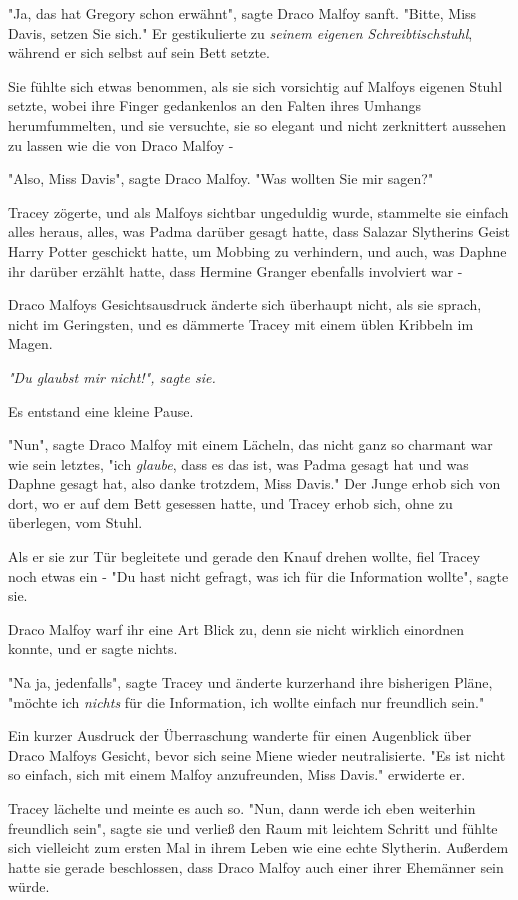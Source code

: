 {"Ja, das hat Gregory schon erwähnt", sagte Draco Malfoy sanft. "Bitte, Miss Davis, setzen Sie sich." Er gestikulierte zu \emph{seinem eigenen Schreibtischstuhl}, während er sich selbst auf sein Bett setzte.

Sie fühlte sich etwas benommen, als sie sich vorsichtig auf Malfoys eigenen Stuhl setzte, wobei ihre Finger gedankenlos an den Falten ihres Umhangs herumfummelten, und sie versuchte, sie so elegant und nicht zerknittert aussehen zu lassen wie die von Draco Malfoy -

"Also, Miss Davis", sagte Draco Malfoy. "Was wollten Sie mir sagen?"

Tracey zögerte, und als Malfoys sichtbar ungeduldig wurde, stammelte sie einfach alles heraus, alles, was Padma darüber gesagt hatte, dass Salazar Slytherins Geist Harry Potter geschickt hatte, um Mobbing zu verhindern, und auch, was Daphne ihr darüber erzählt hatte, dass Hermine Granger ebenfalls involviert war -

Draco Malfoys Gesichtsausdruck änderte sich überhaupt nicht, als sie sprach, nicht im Geringsten, und es dämmerte Tracey mit einem üblen Kribbeln im Magen.

\emph{\emph{"Du glaubst mir nicht!", sagte sie.}}

Es entstand eine kleine Pause.

"Nun", sagte Draco Malfoy mit einem Lächeln, das nicht ganz so charmant war wie sein letztes, "ich \emph{glaube}, dass es das ist, was Padma gesagt hat und was Daphne gesagt hat, also danke trotzdem, Miss Davis." Der Junge erhob sich von dort, wo er auf dem Bett gesessen hatte, und Tracey erhob sich, ohne zu überlegen, vom Stuhl.

Als er sie zur Tür begleitete und gerade den Knauf drehen wollte, fiel Tracey noch etwas ein - "Du hast nicht gefragt, was ich für die Information wollte", sagte sie.

Draco Malfoy warf ihr eine Art Blick zu, denn sie nicht wirklich einordnen konnte, und er sagte nichts.

"Na ja, jedenfalls", sagte Tracey und änderte kurzerhand ihre bisherigen Pläne, "möchte ich \emph{nichts} für die Information, ich wollte einfach nur freundlich sein."

Ein kurzer Ausdruck der Überraschung wanderte für einen Augenblick über Draco Malfoys Gesicht, bevor sich seine Miene wieder neutralisierte. "Es ist nicht so einfach, sich mit einem Malfoy anzufreunden, Miss Davis." erwiderte er.

Tracey lächelte und meinte es auch so. "Nun, dann werde ich eben weiterhin freundlich sein", sagte sie und verließ den Raum mit leichtem Schritt und fühlte sich vielleicht zum ersten Mal in ihrem Leben wie eine echte Slytherin. Außerdem hatte sie gerade beschlossen, dass Draco Malfoy auch einer ihrer Ehemänner sein würde.

}
